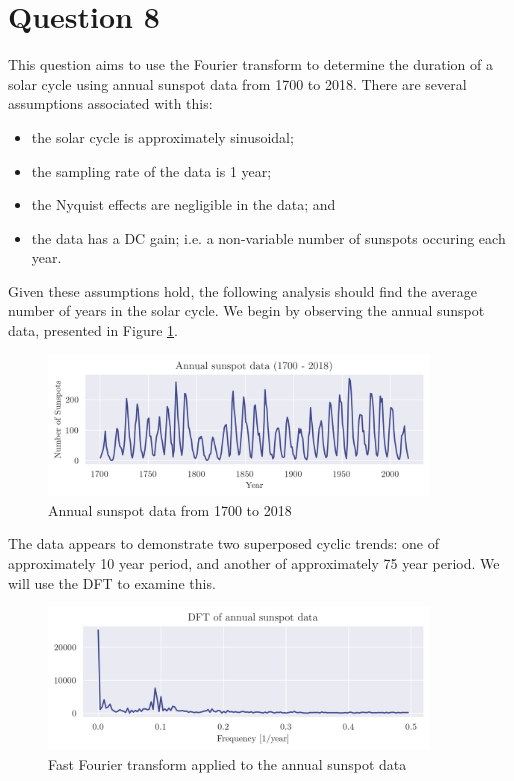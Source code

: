 \documentclass[a4paper, 11pt]{article}
\begin{document}
\newpage
\section*{Question 8}

This question aims to use the Fourier transform to determine the duration of a solar cycle using annual
sunspot data from 1700 to 2018. There are several assumptions associated with this:
\begin{itemize}
    \item the solar cycle is approximately sinusoidal;
    \item the sampling rate of the data is 1 year;
    \item the Nyquist effects are negligible in the data; and
    \item the data has a DC gain; i.e. a non-variable number of sunspots
          occuring each year.
\end{itemize}
Given these assumptions hold, the following analysis should find the average
number of years in the solar cycle. We begin by observing the annual sunspot
data, presented in Figure \ref{fig:q9_timeseries}.

\begin{figure}[ht]
    \centering
    \includegraphics[width=0.9\textwidth]{images/q8_timeseries.png}
    \caption{Annual sunspot data from 1700 to 2018}
    \label{fig:q9_timeseries}
\end{figure}

The data appears to demonstrate two superposed cyclic trends: one of
approximately 10 year period, and another of approximately 75 year period. We
will use the DFT to examine this.

\begin{figure}[ht]
    \centering
    \includegraphics[width=0.9\textwidth]{images/q8_rawdft.png}
    \caption{Fast Fourier transform applied to the annual sunspot data}
    \label{fig:q8_rawdft}
\end{figure}
\end{document}
